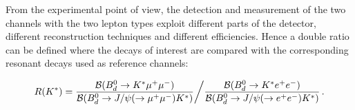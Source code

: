 From the experimental point of view, the detection and measurement of the
two channels with the two lepton types exploit different parts of the detector,
different reconstruction techniques and different efficiencies.
Hence a double ratio can be defined where the decays of interest are compared
with the corresponding resonant decays used as reference channels:

\begin{equation}
  \label{intro:eq:doubleratio}
  {\ensuremath{R(K^{*})}} = {\frac{{\cal B}(B_d^0 \to K^{*}\mu^+\mu^-)}{{\cal B}(B_d^0 \to J/\psi(\to \mu^+\mu^-) K^{*})}} \bigg{/} {\frac{{\ensuremath{\cal B}}(\ensuremath{B_d^0 \to K^{*}e^+e^-})}{{\ensuremath{\cal B}}(\ensuremath{B_d^0 \to J/\psi(\to e^+e^-)K^{*}})}} \, .
\end{equation}


